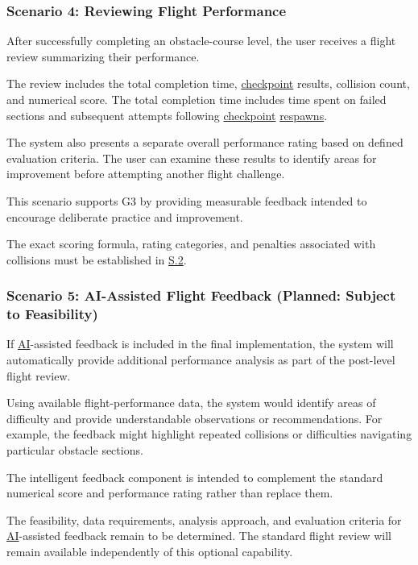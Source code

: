 \documentclass[12pt]{article}
\begin{document}
\subsubsection{Scenario 4: Reviewing Flight Performance}

After successfully completing an obstacle-course level,
the user receives a flight review summarizing their
performance.

The review includes the total completion time, \hyperlink{glos:Checkpoint}{checkpoint}
results, collision count, and numerical score. The total
completion time includes time spent on failed sections
and subsequent attempts following \hyperlink{glos:Checkpoint}{checkpoint} \hyperlink{glos:Respawn}{respawns}.

The system also presents a separate overall performance
rating based on defined evaluation criteria. The user can
examine these results to identify areas for improvement
before attempting another flight challenge.

This scenario supports G3 by providing measurable feedback
intended to encourage deliberate practice and improvement.

The exact scoring formula, rating categories, and penalties
associated with collisions must be established in \hyperref[s2]{S.2}.


\subsubsection{Scenario 5: AI-Assisted Flight Feedback
(Planned: Subject to Feasibility)}

If \hyperlink{glos:AI}{AI}-assisted feedback is included in the final
implementation, the system will automatically provide
additional performance analysis as part of the post-level
flight review.

Using available flight-performance data, the system would
identify areas of difficulty and provide understandable
observations or recommendations. For example, the
feedback might highlight repeated collisions or
difficulties navigating particular obstacle sections.

The intelligent feedback component is intended to
complement the standard numerical score and performance
rating rather than replace them.

The feasibility, data requirements, analysis approach,
and evaluation criteria for \hyperlink{glos:AI}{AI}-assisted feedback remain
to be determined. The standard flight review will remain
available independently of this optional capability.
\end{document}
